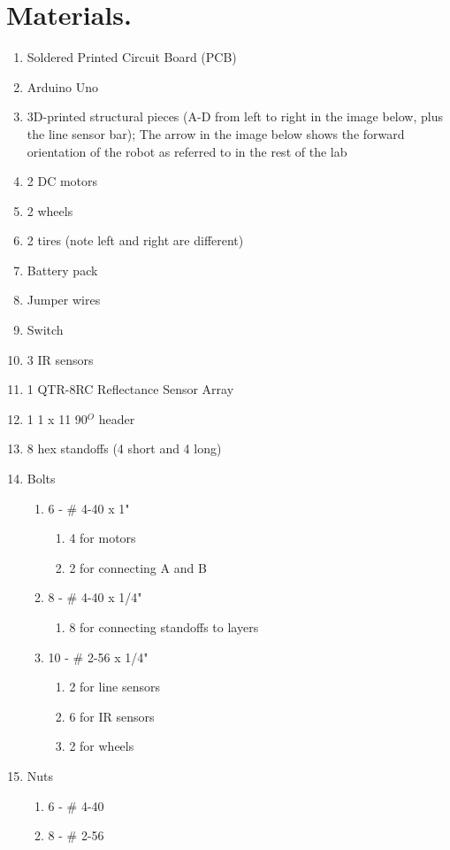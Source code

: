\documentclass{handout}
\begin{document}
	\section{Materials.}
	\begin{enumerate}
		\item Soldered Printed Circuit Board (PCB)
		\item Arduino Uno
		\item 3D-printed structural pieces (A-D from left to right in the image below, plus the line sensor bar); The arrow in the image below shows the forward orientation of the robot as referred to in the rest of the lab
		\item 2 DC motors
		\item 2 wheels
		\item 2 tires (note left and right are different)
		\item Battery pack
		\item Jumper wires
		\item Switch
		\item 3 IR sensors
		\item 1 QTR-8RC Reflectance Sensor Array
		\item 1 1 x 11 90$^O$ header
		\item 8 hex standoffs (4 short and 4 long)
		\item Bolts
		\begin{enumerate}
			\item 6 - \# 4-40 x 1"
			\begin{enumerate}
				\item 4 for motors
				\item 2 for connecting A and B
			\end{enumerate}
			\item 8 - \# 4-40 x 1/4"
			\begin{enumerate}
				\item 8 for connecting standoffs to layers
			\end{enumerate}
			\item 10 - \# 2-56 x 1/4"
			\begin{enumerate}
				\item 2 for line sensors
				\item 6 for IR sensors
				\item 2 for wheels
			\end{enumerate}
		\end{enumerate}
		\item Nuts
		\begin{enumerate}
			\item 6 - \# 4-40
			\item 8 - \# 2-56
		\end{enumerate}
	\end{enumerate}
	
\end{document}
